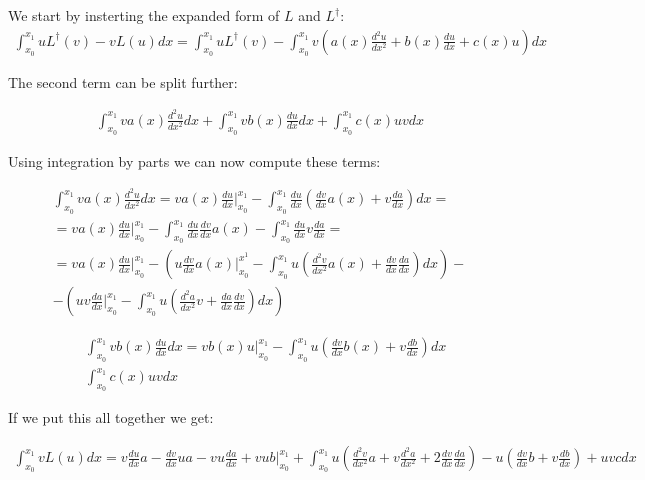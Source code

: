 \documentclass[a4paper]{article}
\begin{document}
We start by insterting the expanded form of $L$ and $L^\dagger$:
\begin{align*}
    \int_{x_0}^{x_1} u L^\dagger(v) - v L(u) dx = \int_{x_0}^{x_1} uL^\dagger(v) - \int_{x_0}^{x_1} v\left( a(x) \frac{d^2 u}{dx^2} + b(x) \frac{du}{dx} + c(x)u \right) dx
\end{align*}

The second term can be split further:

\begin{align*}
    \int_{x_0}^{x_1} v a(x) \frac{d^2 u}{dx^2} dx + \int_{x_0}^{x_1} v b(x) \frac{du}{dx} dx + \int_{x_0}^{x_1} c(x)uv dx
\end{align*}

Using integration by parts we can now compute these terms:

\begin{align*}
    \int_{x_0}^{x_1} v a(x) \frac{d^2 u}{dx^2} dx = va(x)\frac{du}{dx}\bigg\rvert_{x_0}^{x_1} - \int_{x_0}^{x_1} \frac{du}{dx}(\frac{dv}{dx}a(x) + v\frac{da}{dx}) dx = \\
    = va(x)\frac{du}{dx}\bigg\rvert_{x_0}^{x_1} - \int_{x_0}^{x_1} \frac{du}{dx}\frac{dv}{dx}a(x) - \int_{x_0}^{x_1} \frac{du}{dx}v\frac{da}{dx} = \\
    = va(x)\frac{du}{dx}\bigg\rvert_{x_0}^{x_1} - \left( u \frac{dv}{dx} a(x) \bigg\rvert_{x_0}^{x^1} - \int_{x_0}^{x_1} u \left( \frac{d^2v}{dx^2} a(x) + \frac{dv}{dx}\frac{da}{dx}\right)dx\right) - \\
    - \left(uv\frac{da}{dx} \bigg\rvert_{x_0}^{x_1} - \int_{x_0}^{x_1} u \left( \frac{d^2 a}{dx^2}v + \frac{da}{dx}\frac{dv}{dx}\right)dx \right)
\end{align*}

\begin{align*}
    &\int_{x_0}^{x_1} v b(x) \frac{du}{dx} dx = vb(x)u \bigg\rvert_{x_0}^{x_1} - \int_{x_0}^{x_1} u(\frac{dv}{dx}b(x) + v\frac{db}{dx})dx\\ 
    &\int_{x_0}^{x_1} c(x)uv dx
\end{align*}

If we put this all together we get:

\begin{align*}
    \int_{x_0}^{x_1} v L(u) dx = v\frac{du}{dx}a - \frac{dv}{dx}ua - vu \frac{da}{dx} + vub \bigg\rvert_{x_0}^{x_1} + \int_{x_0}^{x_1} u\left(\frac{d^2 v}{dx^2}a + v\frac{d^2a}{dx^2} + 2 \frac{dv}{dx} \frac{da}{dx} \right) - u\left( \frac{dv}{dx}b + v \frac{db}{dx}\right) + uvc dx 
\end{align*}
\end{document}
